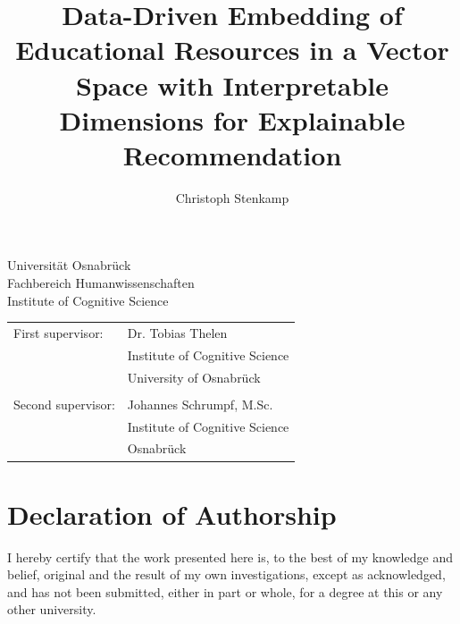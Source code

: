 \documentclass[11pt,
  paper=a4, 
  twoside,  %
  hidelinks,
  bibliography=totocnumbered,
	captions=tableheading,
	BCOR=10mm
]{scrreprt}
\title{Data-Driven Embedding of Educational Resources in a Vector Space with Interpretable Dimensions for Explainable Recommendation}
\author{Christoph Stenkamp}
\theoremstyle{definition}
\begin{document}
\pagestyle{plain} %






\begin{titlepage}
	\begin{flushleft}
		Universität Osnabrück\\
		Fachbereich Humanwissenschaften\\
		Institute of Cognitive Science
	\end{flushleft}

	\vspace{2cm}
	\vspace{1cm}

	\begin{tabular}{ll}
		First supervisor:  & Dr. Tobias Thelen          \\
		                   & Institute of Cognitive Science \\
		                   & University of Osnabrück  \\\\
		Second supervisor: & Johannes Schrumpf, M.Sc.         \\
		                   & Institute of Cognitive Science \\
		                   & Osnabrück
	\end{tabular}

\end{titlepage}


\chapter*{Declaration of Authorship}
I hereby certify that the work presented here is, to the best of my knowledge and belief, original and the result of my own investigations, except as acknowledged, and has not been submitted, either in part or whole, for a degree at this or any other university.
\end{document}
